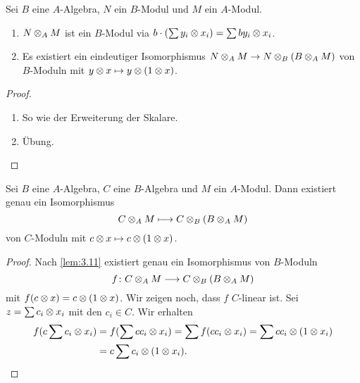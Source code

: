 \documentclass[12pt,a4paper]{scrartcl}
\theoremstyle{cplain}
\theoremstyle{cdef}
\begin{document}
\begin{lem} \label{lem:3.11}
	Sei $B$ eine $A$-Algebra, $N$ ein $B$-Modul und $M$ ein $A$-Modul.
	\begin{enumerate}
		\item $N\otimes_AM$ ist ein $B$-Modul via $b\cdot(\sum y_i\otimes x_i) = \sum by_i\otimes x_i$.
		\item Es existiert ein eindeutiger Isomorphismus $N\otimes_AM\to N\otimes_B(B\otimes_AM)$ von $B$-Moduln mit $y\otimes x\mapsto y\otimes (1\otimes x)$.
	\end{enumerate}
\end{lem}
\begin{proof}
	\leavevmode
	\begin{enumerate}
		\item So wie der Erweiterung der Skalare.
		\item Übung. \qedhere
	\end{enumerate}
\end{proof}

\begin{satz}
	Sei $B$ eine $A$-Algebra, $C$ eine $B$-Algebra und $M$ ein $A$-Modul. Dann existiert genau ein Isomorphismus
	$$C\otimes_A M  \longmapsto  C\otimes_B(B\otimes_AM)$$
	von $C$-Moduln mit $c\otimes x\mapsto c\otimes(1\otimes x)$.
\end{satz}
\begin{proof}
	Nach \cref{lem:3.11} existiert genau ein Isomorphismus von $B$-Moduln
	\[ f\colon C\otimes_AM\longrightarrow C\otimes_B(B\otimes_AM)\]
	mit $f(c\otimes x) = c\otimes(1\otimes x)$. Wir zeigen noch, dass $f$ $C$-linear ist. Sei $z = \sum c_i\otimes x_i$ mit den $c_i\in C$. Wir erhalten
	\begin{align*}
		f(c\sum c_i\otimes x_i) &= f(\sum cc_i\otimes x_i ) = \sum f(cc_i\otimes x_i) = \sum cc_i\otimes(1\otimes x_i) \\
		&= c\sum c_i\otimes(1\otimes x_i). \qedhere
	\end{align*}
\end{proof}
\end{document}
